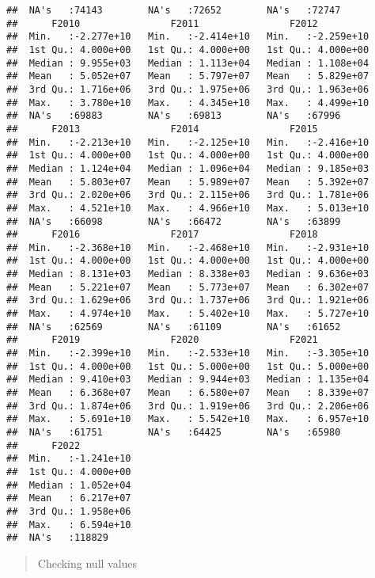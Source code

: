 \documentclass[
]{article}
\begin{document}
\begin{verbatim}
##  NA's   :74143        NA's   :72652        NA's   :72747       
##      F2010                F2011                F2012           
##  Min.   :-2.277e+10   Min.   :-2.414e+10   Min.   :-2.259e+10  
##  1st Qu.: 4.000e+00   1st Qu.: 4.000e+00   1st Qu.: 4.000e+00  
##  Median : 9.955e+03   Median : 1.113e+04   Median : 1.108e+04  
##  Mean   : 5.052e+07   Mean   : 5.797e+07   Mean   : 5.829e+07  
##  3rd Qu.: 1.716e+06   3rd Qu.: 1.975e+06   3rd Qu.: 1.963e+06  
##  Max.   : 3.780e+10   Max.   : 4.345e+10   Max.   : 4.499e+10  
##  NA's   :69883        NA's   :69813        NA's   :67996       
##      F2013                F2014                F2015           
##  Min.   :-2.213e+10   Min.   :-2.125e+10   Min.   :-2.416e+10  
##  1st Qu.: 4.000e+00   1st Qu.: 4.000e+00   1st Qu.: 4.000e+00  
##  Median : 1.124e+04   Median : 1.096e+04   Median : 9.185e+03  
##  Mean   : 5.803e+07   Mean   : 5.989e+07   Mean   : 5.392e+07  
##  3rd Qu.: 2.020e+06   3rd Qu.: 2.115e+06   3rd Qu.: 1.781e+06  
##  Max.   : 4.521e+10   Max.   : 4.966e+10   Max.   : 5.013e+10  
##  NA's   :66098        NA's   :66472        NA's   :63899       
##      F2016                F2017                F2018           
##  Min.   :-2.368e+10   Min.   :-2.468e+10   Min.   :-2.931e+10  
##  1st Qu.: 4.000e+00   1st Qu.: 4.000e+00   1st Qu.: 4.000e+00  
##  Median : 8.131e+03   Median : 8.338e+03   Median : 9.636e+03  
##  Mean   : 5.221e+07   Mean   : 5.773e+07   Mean   : 6.302e+07  
##  3rd Qu.: 1.629e+06   3rd Qu.: 1.737e+06   3rd Qu.: 1.921e+06  
##  Max.   : 4.974e+10   Max.   : 5.402e+10   Max.   : 5.727e+10  
##  NA's   :62569        NA's   :61109        NA's   :61652       
##      F2019                F2020                F2021           
##  Min.   :-2.399e+10   Min.   :-2.533e+10   Min.   :-3.305e+10  
##  1st Qu.: 4.000e+00   1st Qu.: 5.000e+00   1st Qu.: 5.000e+00  
##  Median : 9.410e+03   Median : 9.944e+03   Median : 1.135e+04  
##  Mean   : 6.368e+07   Mean   : 6.580e+07   Mean   : 8.339e+07  
##  3rd Qu.: 1.874e+06   3rd Qu.: 1.919e+06   3rd Qu.: 2.206e+06  
##  Max.   : 5.691e+10   Max.   : 5.542e+10   Max.   : 6.957e+10  
##  NA's   :61751        NA's   :64425        NA's   :65980       
##      F2022           
##  Min.   :-1.241e+10  
##  1st Qu.: 4.000e+00  
##  Median : 1.052e+04  
##  Mean   : 6.217e+07  
##  3rd Qu.: 1.958e+06  
##  Max.   : 6.594e+10  
##  NA's   :118829
\end{verbatim}

\begin{quote}
Checking null values
\end{quote}
\end{document}
